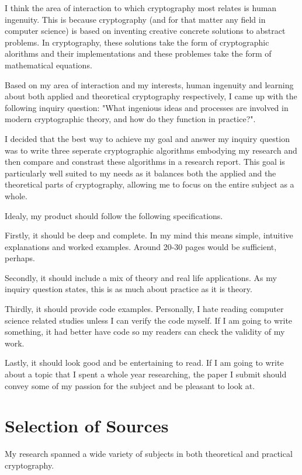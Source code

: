 \documentclass[12pt, a4paper, draft]{report}
\begin{document}
I think the area of interaction to which cryptography most relates is
human ingenuity. This is because cryptography (and for that matter any
field in computer science) is based on inventing creative concrete
solutions to abstract problems. In cryptography, these solutions
take the form of cryptographic alorithms and their implementations
and these problemes take the form of mathematical equations.

Based on my area of interaction and my interests, human ingenuity and
learning about both applied and theoretical cryptography respectively, I
came up with the following inquiry question: "What ingenious ideas and
processes are involved in modern cryptographic theory, and how do they
function in practice?".

I decided that the best way to achieve my goal and answer my inquiry
question was to write three seperate cryptographic algorithms embodying
my research and then compare and constrast these algorithms in a research
report. This goal is particularly well suited to my needs as it balances
both the applied and the theoretical parts of cryptography, allowing me to
focus on the entire subject as a whole.

Idealy, my product should follow the following specifications.

Firstly, it should be deep and complete. In my mind this means simple,
intuitive explanations and worked examples. Around 20-30 pages would be
sufficient, perhaps.

Secondly, it should include a mix of theory and real life applications.
As my inquiry question states, this is as much about practice as it is
theory.

Thirdly, it should provide code examples. Personally, I hate reading
computer science related studies unless I can verify the code myself.
If I am going to write something, it had better have code so my
readers can check the validity of my work.

Lastly, it should look good and be entertaining to read. If I am
going to write about a topic that I spent a whole year researching,
the paper I submit should convey some of my passion for the subject
and be pleasant to look at.

\section{Selection of Sources}

My research spanned a wide variety of subjects in both theoretical and
practical cryptography.
\end{document}
